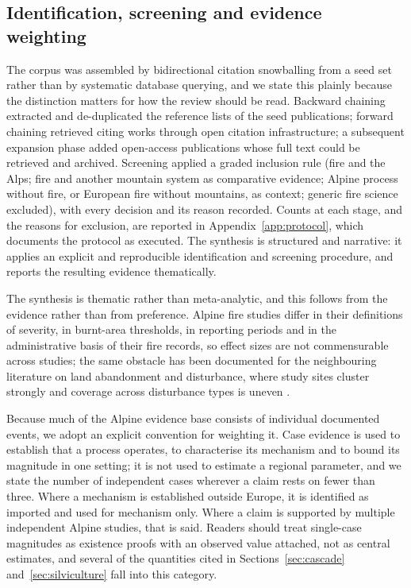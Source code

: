 \documentclass[11pt,a4paper]{article}
\begin{document}
\subsection{Identification, screening and evidence weighting}

The corpus was assembled by bidirectional citation snowballing from a seed set rather than by systematic database querying, and we state this plainly because the distinction matters for how the review should be read. Backward chaining extracted and de-duplicated the reference lists of the seed publications; forward chaining retrieved citing works through open citation infrastructure; a subsequent expansion phase added open-access publications whose full text could be retrieved and archived. Screening applied a graded inclusion rule (fire and the Alps; fire and another mountain system as comparative evidence; Alpine process without fire, or European fire without mountains, as context; generic fire science excluded), with every decision and its reason recorded. Counts at each stage, and the reasons for exclusion, are reported in Appendix~\ref{app:protocol}, which documents the protocol as executed. The synthesis is structured and narrative: it applies an explicit and reproducible identification and screening procedure, and reports the resulting evidence thematically.

The synthesis is thematic rather than meta-analytic, and this follows from the evidence rather than from preference. Alpine fire studies differ in their definitions of severity, in burnt-area thresholds, in reporting periods and in the administrative basis of their fire records, so effect sizes are not commensurable across studies; the same obstacle has been documented for the neighbouring literature on land abandonment and disturbance, where study sites cluster strongly and coverage across disturbance types is uneven \citep{mantero_influence_2020}.

Because much of the Alpine evidence base consists of individual documented events, we adopt an explicit convention for weighting it. Case evidence is used to establish that a process operates, to characterise its mechanism and to bound its magnitude in one setting; it is not used to estimate a regional parameter, and we state the number of independent cases wherever a claim rests on fewer than three. Where a mechanism is established outside Europe, it is identified as imported and used for mechanism only. Where a claim is supported by multiple independent Alpine studies, that is said. Readers should treat single-case magnitudes as existence proofs with an observed value attached, not as central estimates, and several of the quantities cited in Sections~\ref{sec:cascade} and~\ref{sec:silviculture} fall into this category.
\end{document}
